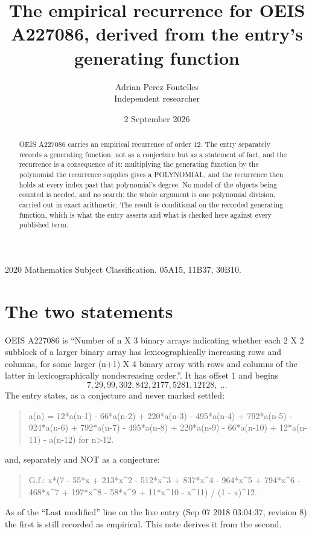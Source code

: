 \documentclass[11pt,a4paper]{article}
\title{The empirical recurrence for OEIS A227086, derived from the entry's generating function}
\author{Adrian Perez Fontelles\\ \small Independent researcher}
\date{2 September 2026}
\theoremstyle{plain}
\theoremstyle{definition}
\begin{document}
\maketitle

\begin{abstract}
OEIS A227086 carries an empirical recurrence of order $12$. The entry separately records a
generating function, not as a conjecture but as a statement of fact, and the recurrence is a
consequence of it: multiplying the generating function by the polynomial the recurrence
supplies gives a POLYNOMIAL, and the recurrence then holds at every index past that
polynomial's degree. No model of the objects being counted is needed, and no search: the
whole argument is one polynomial division, carried out in exact arithmetic. The result is
conditional on the recorded generating function, which is what the entry asserts and what is
checked here against every published term.
\end{abstract}

\noindent\small 2020 Mathematics Subject Classification. 05A15, 11B37, 30B10.\normalsize

\section{The two statements}

OEIS A227086 is ``Number of n X 3 binary arrays indicating whether each 2 X 2 subblock of a larger binary array has lexicographically increasing rows and columns, for some larger (n+1) X 4 binary array with rows and columns of the latter in lexicographically nondecreasing order.''. It has offset $1$ and begins
\[
7, 29, 99, 302, 842, 2177, 5281, 12128,\ \dots
\]
The entry states, as a conjecture and never marked settled:
\begin{quote}
a(n) = 12*a(n-1) - 66*a(n-2) + 220*a(n-3) - 495*a(n-4) + 792*a(n-5) - 924*a(n-6) + 792*a(n-7) - 495*a(n-8) + 220*a(n-9) - 66*a(n-10) + 12*a(n-11) - a(n-12) for n>12.
\end{quote}
and, separately and NOT as a conjecture:
\begin{quote}
G.f.: x*(7 - 55*x + 213*x\^{}2 - 512*x\^{}3 + 837*x\^{}4 - 964*x\^{}5 + 794*x\^{}6 - 468*x\^{}7 + 197*x\^{}8 - 58*x\^{}9 + 11*x\^{}10 - x\^{}11) / (1 - x)\^{}12.
\end{quote}
As of the ``Last modified'' line on the live entry (Sep 07 2018 03:04:37, revision 8) the first is still
recorded as empirical. This note derives it from the second.
\end{document}

